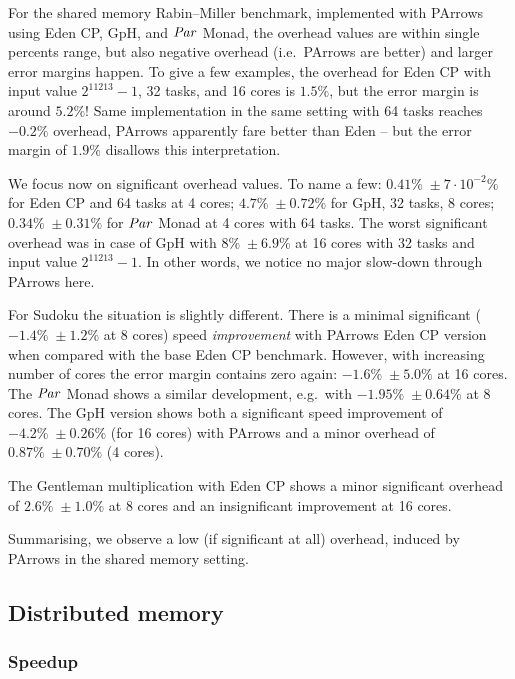 \documentclass[paper=A4,twoside=true,openright,parskip=full,chapterprefix=true,headings=normal,bibliography=totoc,listof=totoc,titlepage=on,captions=tableabove,draft=false,british]{scrreprt}%
\begin{document}
For the shared memory Rabin--Miller benchmark, implemented with PArrows
using Eden CP, GpH, and \ensuremath{\Conid{Par}} Monad, the overhead values are within
single percents range, but also negative overhead (i.e.~PArrows are
better) and larger error margins happen. To give a few examples, the
overhead for Eden CP with input value \(2^{11213}-1\), 32 tasks, and 16
cores is \(1.5\%\), but the error margin is around \(5.2\%\)! Same
implementation in the same setting with 64 tasks reaches \(-0.2\%\)
overhead, PArrows apparently fare better than Eden -- but the error
margin of \(1.9\%\) disallows this interpretation.

We focus now on significant overhead values. To name a few:
\(0.41\%\; \pm 7\cdot 10^{-2}\%\) for Eden CP and 64 tasks at 4 cores;
\(4.7\% \; \pm 0.72\%\) for GpH, 32 tasks, 8 cores;
\(0.34\% \; \pm 0.31\%\) for \ensuremath{\Conid{Par}} Monad at 4 cores with 64 tasks. The
worst significant overhead was in case of GpH with \(8\% \; \pm 6.9\%\)
at 16 cores with 32 tasks and input value \(2^{11213}-1\). In other
words, we notice no major slow-down through PArrows here.

For Sudoku the situation is slightly different. There is a minimal
significant (\(-1.4\% \; \pm 1.2\%\) at 8 cores) speed
\emph{improvement} with PArrows Eden CP version when compared with the
base Eden CP benchmark. However, with increasing number of cores the
error margin contains zero again: \(-1.6\% \; \pm 5.0\%\) at 16 cores.
The \ensuremath{\Conid{Par}} Monad shows a similar development, e.g.~with
\(-1.95\% \; \pm 0.64\%\) at 8 cores. The GpH version shows both a
significant speed improvement of \(-4.2\% \; \pm 0.26\%\) (for 16 cores)
with PArrows and a minor overhead of \(0.87\% \; \pm 0.70\%\) (4 cores).

The Gentleman multiplication with Eden CP shows a minor significant
overhead of \(2.6\% \; \pm 1.0\%\) at 8 cores and an insignificant
improvement at 16 cores.

Summarising, we observe a low (if significant at all) overhead, induced
by PArrows in the shared memory setting.

\hypertarget{distributed-memory}{%
\subsection{Distributed memory}\label{distributed-memory}}

\label{sec:benchmarksDistMem}

\hypertarget{speedup-1}{%
\subsubsection{Speedup}\label{speedup-1}}
\end{document}
